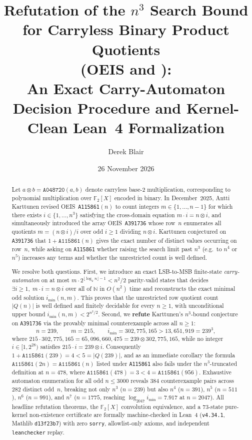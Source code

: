 \documentclass[11pt]{article}
\title{Refutation of the $n^3$ Search Bound for Carryless Binary Product Quotients\\(OEIS \seq{A115861} and \seq{A391736}):\\[2pt]
\large An Exact Carry-Automaton Decision Procedure and Kernel-Clean Lean~4 Formalization}
\author{Derek Blair}
\date{26 November 2026}
\theoremstyle{definition}
\newcommand{\N}{\mathbb{N}}
\newcommand{\F}{\mathbb{F}}
\newcommand{\seq}[1]{\texttt{#1}}
\newcommand{\clmul}{\otimes}
\begin{document}
\maketitle

\begin{abstract}
Let $a \clmul b = \seq{A048720}(a, b)$ denote carryless base-$2$ multiplication, corresponding to polynomial multiplication over $\F_2[X]$ encoded in binary. In December~2025, Antti Karttunen revised OEIS~\seq{A115861}$(n)$ to count integers $m \in \{1, \dots, n-1\}$ for which there exists $i \in \{1, \dots, n^3\}$ satisfying the cross-domain equation $m \cdot i = n \clmul i$, and simultaneously introduced the array OEIS~\seq{A391736} whose row~$n$ enumerates all quotients $m = (n \clmul i)/i$ over odd $i \ge 1$ dividing $n \clmul i$. Karttunen conjectured on \seq{A391736} that $1 + \seq{A115861}(n)$ gives the exact number of distinct values occurring on row~$n$, while asking on \seq{A115861} whether raising the search limit past $n^3$ (e.g.\ to $n^4$ or $n^5$) increases any terms and whether the unrestricted count is well defined.

We resolve both questions. First, we introduce an exact LSB-to-MSB finite-state \emph{carry-automaton} on at most $m \cdot 2^{\lfloor \log_2 n \rfloor - 1} < n^2 / 2$ parity-valid states that decides $\exists i \ge 1,\; m \cdot i = n \clmul i$ over all of $\N$ in $O(n^2)$ time and reconstructs the exact minimal odd solution $i_{\min}(n, m)$. This proves that the unrestricted row quotient count $|Q(n)|$ is well defined and finitely decidable for every $n \ge 1$, with unconditional upper bound $i_{\min}(n, m) < 2^{n^2/2}$. Second, we \textbf{refute} Karttunen's $n^3$-bound conjecture on \seq{A391736} via the provably minimal counterexample across all $n \ge 1$:
\[
n = 239, \qquad m = 215, \qquad i_{\min} = 302{,}775{,}165 > 13{,}651{,}919 = 239^3,
\]
where $215 \cdot 302{,}775{,}165 = 65{,}096{,}660{,}475 = 239 \clmul 302{,}775{,}165$, while no integer $i \in [1, 2^{28})$ satisfies $215 \cdot i = 239 \clmul i$. Consequently $1 + \seq{A115861}(239) = 4 < 5 = |Q(239)|$, and as an immediate corollary the formula $\seq{A115861}(2n) = \seq{A115861}(n)$ listed under \seq{A115861} also fails under the $n^3$-truncated definition at $n = 478$, where $\seq{A115861}(478) = 3 < 4 = \seq{A115861}(956)$. Exhaustive automaton enumeration for all odd $n \le 3000$ reveals $384$ counterexample pairs across $282$ distinct odd~$n$, breaking not only $n^3$ ($n = 239$) but also $n^4$ ($n = 391$), $n^5$ ($n = 511$), $n^6$ ($n = 991$), and $n^7$ ($n = 1775$, reaching $\log_{2047} i_{\min} = 7.917$ at $n = 2047$). All headline refutation theorems, the $\F_2[X]$ convolution equivalence, and a 73-state pure-kernel non-existence certificate are formally machine-checked in Lean~4 (\texttt{v4.34.1}, Mathlib \texttt{d13f23b7}) with zero \texttt{sorry}, allowlist-only axioms, and independent \texttt{leanchecker} replay.
\end{abstract}
\end{document}
